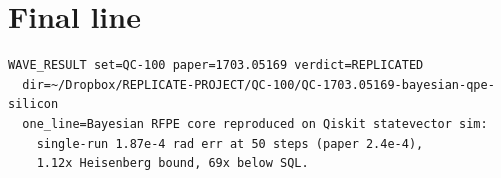 \documentclass[11pt]{article}
\begin{document}
\section{Final line}
\begin{verbatim}
WAVE_RESULT set=QC-100 paper=1703.05169 verdict=REPLICATED
  dir=~/Dropbox/REPLICATE-PROJECT/QC-100/QC-1703.05169-bayesian-qpe-silicon
  one_line=Bayesian RFPE core reproduced on Qiskit statevector sim:
    single-run 1.87e-4 rad err at 50 steps (paper 2.4e-4),
    1.12x Heisenberg bound, 69x below SQL.
\end{verbatim}
\end{document}
